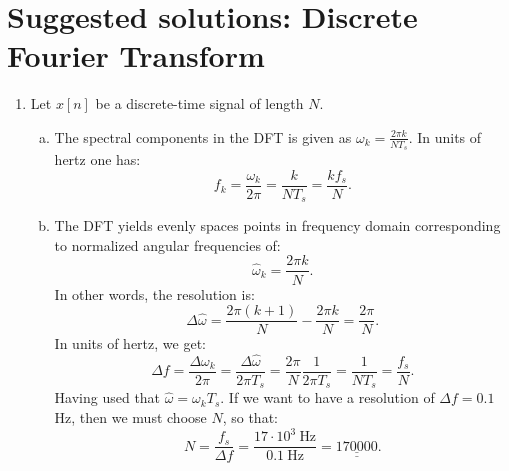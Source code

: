 \newpage
\section{Suggested solutions: Discrete Fourier Transform}

\begin{enumerate}
\item Let $x[n]$ be a discrete-time signal of length $N$.

\begin{enumerate}[a)]
\item The spectral components in the DFT is given as $\omega_{k}=\frac{2\pi k}{NT_{s}}$. In units of hertz one has:
$$f_{k}=\frac{\omega_k}{2\pi}=\frac{k}{NT_{s}}=\frac{kf_{s}}{N}.$$

\item The DFT yields evenly spaces points in frequency domain corresponding to normalized angular frequencies of:
$$\hat{\omega}_{k}=\frac{2\pi k}{N}.$$
In other words, the resolution is:
$$\Delta\hat{\omega}=\frac{2\pi (k+1)}{N}-\frac{2\pi k}{N}=\frac{2\pi}{N}.$$
In units of hertz, we get:
$$\Delta f = \frac{\Delta\omega_{k}}{2\pi}=\frac{\Delta\hat{\omega}}{2\pi T_{s}}=\frac{2\pi}{N}\frac{1}{2\pi T_{s}}=\frac{1}{N T_{s}}=\frac{f_{s}}{N}.$$
Having used that $\hat{\omega}=\omega_{k}T_{s}$. If we want to have a resolution of $\Delta f=0.1$ Hz, then we must choose $N$, so that:
$$N=\frac{f_{s}}{\Delta f}=\frac{17\cdot 10^{3}\ \text{Hz}}{0.1\ \text{Hz}}=\underline{\underline{170000}}.$$
\end{enumerate}

\end{enumerate}
